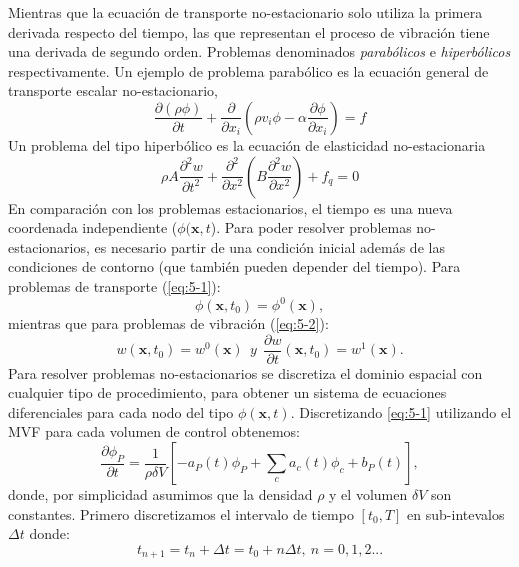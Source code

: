 \documentclass[a4paper,10pt, oneside]{book}
\begin{document}
Mientras que la ecuación de transporte no-estacionario solo utiliza la primera derivada respecto del tiempo, las que representan el proceso de vibración tiene una derivada de segundo orden. Problemas denominados \textit{parabólicos} e \textit{hiperbólicos} respectivamente.
Un ejemplo de problema parabólico es la ecuación general de transporte escalar no-estacionario,
\begin{equation}
	\frac{\partial (\rho \phi)}{\partial t} + \frac{\partial}{\partial x_i} \left( \rho v_i \phi - \alpha \frac{\partial \phi}{\partial x_i} \right) = f
	\label{eq:5-1}
\end{equation}
Un problema del tipo hiperbólico es la ecuación de elasticidad no-estacionaria
\begin{equation}
	\rho A \frac{\partial^2 w}{\partial t^2} + \frac{\partial^2}{\partial x^2} \left( B \frac{\partial^2 w}{\partial x^2} \right) + f_q = 0
	\label{eq:5-2}
\end{equation}
En comparación con los problemas estacionarios, el tiempo es una nueva coordenada independiente ($\phi(\textbf{x}, t$). Para poder resolver problemas no-estacionarios, es necesario partir de una condición inicial además de las condiciones de contorno (que también pueden depender del tiempo). Para problemas de transporte (\ref{eq:5-1}):
\begin{equation}
	\phi(\textbf{x},t_0) = \phi^0(\textbf{x}), \nonumber
\end{equation}
mientras que para problemas de vibración (\ref{eq:5-2}):
\begin{equation}
	w(\textbf{x},t_0) = w^0(\textbf{x}) \ \ y \ \ \frac{\partial w}{\partial t}(\textbf{x},t_0) = w^1(\textbf{x}). \nonumber
\end{equation}
Para resolver problemas no-estacionarios se discretiza el dominio espacial con cualquier tipo de procedimiento, para obtener un sistema de ecuaciones diferenciales para cada nodo del tipo $\phi(\textbf{x},t)$. Discretizando \ref{eq:5-1} utilizando el MVF para cada volumen de control obtenemos:
\begin{equation}
	\frac{\partial \phi_P}{\partial t} = \frac{1}{\rho \delta V} \left[ -a_P(t) \phi_P + \sum_c a_c(t)\phi_c + b_P(t) \right],
	\label{eq:5-3}
\end{equation}
donde, por simplicidad asumimos que la densidad $\rho$ y el volumen $\delta V$ son constantes.
Primero discretizamos el intervalo de tiempo $[t_0,T]$ en sub-intevalos $\Delta t$ donde:
\begin{equation}
	t_{n+1} = t_n + \Delta t = t_0 + n\Delta t, ~ n=0,1,2 ... \nonumber
\end{equation}
\end{document}
